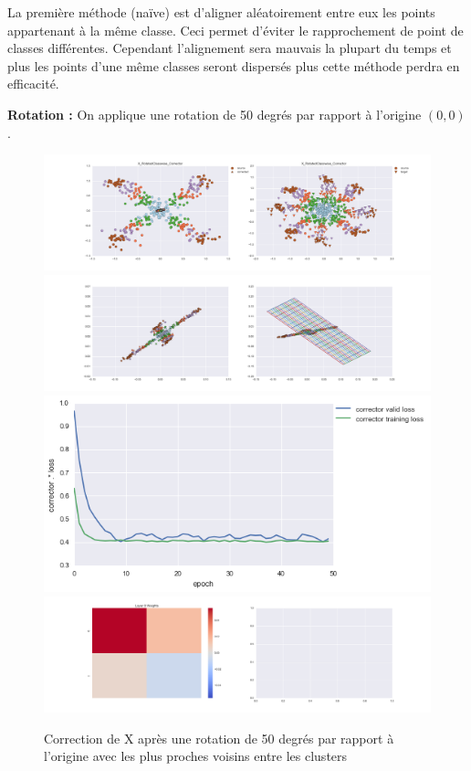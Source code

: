 La première méthode (naïve) est d'aligner aléatoirement entre eux les points appartenant à la même classe.
Ceci permet d'éviter le rapprochement de point de classes différentes. Cependant l'alignement sera mauvais
la plupart du temps et plus les points d'une même classes seront dispersés plus cette méthode perdra en efficacité.


{\Large \textbf{Rotation :}} On applique une rotation de 50 degrés par rapport à l'origine $(0,0)$.

\begin{figure}[H] %
\centering
\includegraphics[width=\linewidth]{fig/24-05-2016/X/X_RotatedClasswise_Corrector-DATA.png}
\includegraphics[width=\linewidth]{fig/24-05-2016/X/X_RotatedClasswise_Corrector-GridCheck.png}
\includegraphics[width=0.45\linewidth]{fig/24-05-2016/X/X_RotatedClasswise_Corrector-Learning_curve.png}
\includegraphics[width=\linewidth]{fig/24-05-2016/X/X_RotatedClasswise_Corrector-W.png}
\caption{Correction de X après une rotation de 50 degrés par rapport à l'origine avec les plus proches voisins entre les clusters}
\label{fig:recap-X-rot-classwise}
\end{figure}


